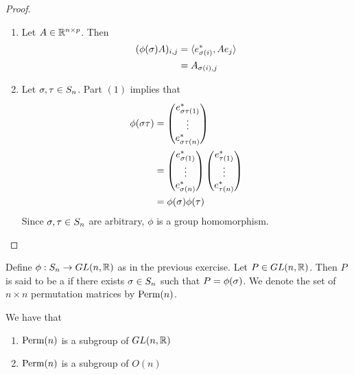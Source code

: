 \documentclass{book}
\begin{document}
	\begin{proof}
		\begin{enumerate}
			\item Let  $A \in \mathbb{R}^{n \times p}$. Then 
			\begin{align*}
				(\phi(\sigma) A)_{i,j}
				& = \langle e_{\sigma(i)}^*, A e_j \rangle \\
				& = A_{\sigma(i), j}
			\end{align*}
			\item Let $\sigma, \tau \in S_n$. Part $(1)$ implies that 
			\begin{align*}
				\phi(\sigma \tau)
				& = 
				\begin{pmatrix}
					e_{\sigma \tau (1)}^* \\
					\vdots \\
					e_{\sigma \tau (n)}^*
				\end{pmatrix} \\
				& = \begin{pmatrix}
					e_{\sigma (1)}^* \\
					\vdots \\
					e_{\sigma (n)}^*
				\end{pmatrix} 
				\begin{pmatrix}
					e_{\tau (1)}^* \\
					\vdots \\
					e_{\tau (n)}^*
				\end{pmatrix} \\
				& = \phi(\sigma) \phi(\tau)
			\end{align*}
			Since $\sigma, \tau \in S_n$ are arbitrary, $\phi$ is a group homomorphism. 
		\end{enumerate}
	\end{proof}
	
	
	\begin{defn}
		Define $\phi: S_n \rightarrow GL(n, \mathbb{R})$ as in the previous exercise. Let $P \in GL(n, \mathbb{R})$. Then $P$ is said to be a  if there exists $\sigma \in S_n$ such that $P = \phi(\sigma)$. We denote the set of $n \times n$ permutation matrices by $\text{Perm}(n)$.
	\end{defn}

	\begin{ex}
		We have that
		\begin{enumerate} 
			\item $\text{Perm}(n)$ is a subgroup of $GL(n, \mathbb{R})$
			\item $\text{Perm}(n)$ is a subgroup of $O(n)$
		\end{enumerate}
	\end{ex}
\end{document}
